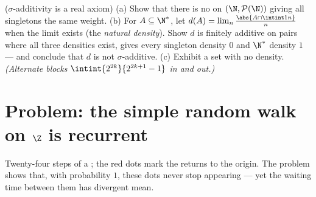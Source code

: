 \begin{exercise}[$\star\star\star$]\label{exo:b2:proba:12}
($\sigma$-additivity is a real axiom)
(a) Show that there is no  on $(\N,
\mathcal P(\N))$ giving all singletons the same weight.
(b) For $A \subseteq \N^*$, let $d(A) =
\lim_n\frac{\abs{A\cap\intint1n}}{n}$ when the limit exists
(the \emph{natural density}). Show $d$ is finitely additive
on pairs where all three densities exist, gives every
singleton density $0$ and $\N^*$ density $1$ --- and conclude
that $d$ is not $\sigma$-additive.
(c) Exhibit a set with no density. \emph{(Alternate blocks
$\intint{2^{2k}}{2^{2k+1}-1}$ in and out.)}
\end{exercise}

\section{Problem: the simple random walk on $\Z$ is recurrent}

\begin{omfigure}

{\small Twenty-four steps of a ; the red
dots mark the returns to the origin. The problem shows that,
with probability $1$, these dots never stop appearing --- yet
the waiting time between them has divergent mean.}
\end{omfigure}

